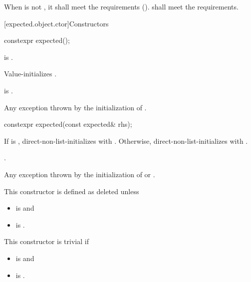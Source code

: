 \pnum
When  is not \cv{} , it shall meet
the  requirements ().
 shall meet
the  requirements.

[expected.object.ctor]{Constructors}

%
\begin{itemdecl}
constexpr expected();
\end{itemdecl}

\begin{itemdescr}
\pnum
\constraints
{} is .

\pnum
\effects
Value-initializes .

\pnum
\ensures
{} is .

\pnum
\throws
Any exception thrown by the initialization of .
\end{itemdescr}

%
\begin{itemdecl}
constexpr expected(const expected& rhs);
\end{itemdecl}

\begin{itemdescr}
\pnum
\effects
If  is ,
direct-non-list-initializes  with .
Otherwise, direct-non-list-initializes  with .

\pnum
\ensures
{}.

\pnum
\throws
Any exception thrown by the initialization of  or .

\pnum
\remarks
This constructor is defined as deleted unless
\begin{itemize}
\item
{} is  and
\item
{} is .
\end{itemize}

\pnum
This constructor is trivial if
\begin{itemize}
\item
{} is  and
\item
{} is .
\end{itemize}
\end{itemdescr}

